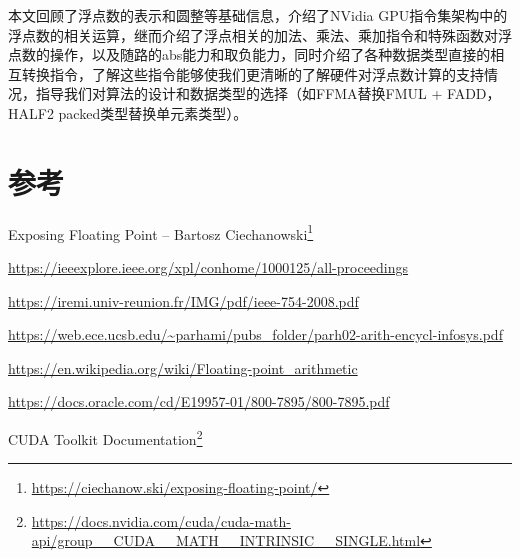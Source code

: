 本文回顾了浮点数的表示和圆整等基础信息，介绍了NVidia GPU指令集架构中的浮点数的相关运算，继而介绍了浮点相关的加法、乘法、乘加指令和特殊函数对浮点数的操作，以及随路的abs能力和取负能力，同时介绍了各种数据类型直接的相互转换指令，了解这些指令能够使我们更清晰的了解硬件对浮点数计算的支持情况，指导我们对算法的设计和数据类型的选择（如FFMA替换FMUL + FADD，HALF2 packed类型替换单元素类型）。

\section{参考}

Exposing Floating Point – Bartosz Ciechanowski\footnote{\url{https://ciechanow.ski/exposing-floating-point/}}

\url{https://ieeexplore.ieee.org/xpl/conhome/1000125/all-proceedings}

\url{https://iremi.univ-reunion.fr/IMG/pdf/ieee-754-2008.pdf}

\url{https://web.ece.ucsb.edu/~parhami/pubs_folder/parh02-arith-encycl-infosys.pdf}

\url{https://en.wikipedia.org/wiki/Floating-point_arithmetic}

\url{https://docs.oracle.com/cd/E19957-01/800-7895/800-7895.pdf}

CUDA Toolkit Documentation\footnote{\url{https://docs.nvidia.com/cuda/cuda-math-api/group__CUDA__MATH__INTRINSIC__SINGLE.html}}
